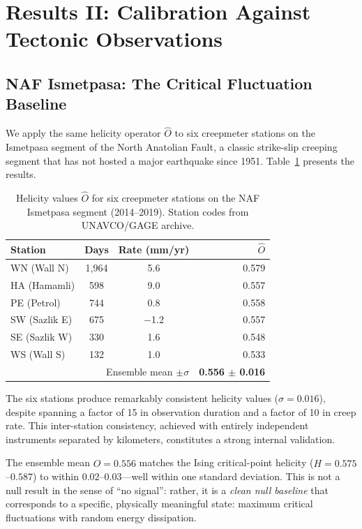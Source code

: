 \documentclass[aps,prl,twocolumn,superscriptaddress,byrevtex]{article}
\begin{document}
\section{Results II: Calibration Against Tectonic Observations}

\subsection{NAF Ismetpasa: The Critical Fluctuation Baseline}

We apply the same helicity operator $\hat{O}$ to six creepmeter stations on the
Ismetpasa segment of the North Anatolian Fault, a classic strike-slip creeping
segment that has not hosted a major earthquake since 1951. Table~\ref{tab:naf}
presents the results.

\begin{table}[t]
\centering
\caption{Helicity values $\hat{O}$ for six creepmeter stations on the NAF Ismetpasa
segment (2014--2019). Station codes from UNAVCO/GAGE archive.}
\label{tab:naf}
\begin{tabular}{lccr}
\toprule
Station      & Days   & Rate (mm/yr) & $\hat{O}$ \\
\midrule
WN (Wall N)  & 1,964  & 5.6  & 0.579 \\
HA (Hamamli) & 598    & 9.0  & 0.557 \\
PE (Petrol)  & 744    & 0.8  & 0.558 \\
SW (Sazlik E)& 675    & $-$1.2 & 0.557 \\
SE (Sazlik W)& 330    & 1.6  & 0.548 \\
WS (Wall S)  & 132    & 1.0  & 0.533 \\
\midrule
\multicolumn{3}{r}{Ensemble mean $\pm \sigma$} & \textbf{0.556 $\pm$ 0.016} \\
\bottomrule
\end{tabular}
\end{table}

The six stations produce remarkably consistent helicity values ($\sigma = 0.016$),
despite spanning a factor of 15 in observation duration and a factor of 10 in creep
rate. This inter-station consistency, achieved with entirely independent instruments
separated by kilometers, constitutes a strong internal validation.

The ensemble mean $\hat{O} = 0.556$ matches the Ising critical-point helicity
($H = 0.575$--$0.587$) to within $0.02$--$0.03$---well within one standard deviation.
This is not a null result in the sense of ``no signal'': rather, it is a
\emph{clean null baseline} that corresponds to a specific, physically meaningful
state: maximum critical fluctuations with random energy dissipation.
\end{document}
